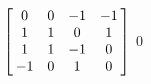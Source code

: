 {$\left[\hskip -3pt \begin{array}{cccc} 0&0&-1&-1\\  1&1&0&1
\\  1&1&-1&0\\  -1&0&1&0\end{array}\hskip -3pt \right] 
$} 
{$0$}

  

 


